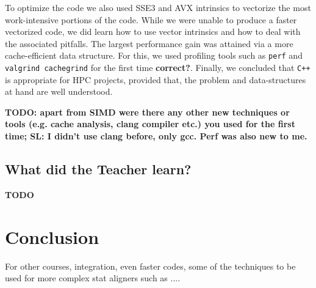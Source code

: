 \documentclass[runningheads,a4paper]{llncs}
\begin{document}
To optimize the code we also used SSE3 and AVX intrinsics to vectorize the most work-intensive portions of the code. 
While we were unable to produce a faster vectorized code, we did learn how to use vector intrinsics and how to deal with the associated pitfalls. 
The largest performance gain was attained via a more cache-efficient data structure. 
For this, we used profiling tools such as \texttt{perf} and \texttt{valgrind cachegrind} for the first time {\bf correct?}. 
Finally,  we concluded that \verb|C++| is appropriate for HPC projects, provided that, the problem and data-structures at hand are well understood.

{\bf TODO: apart from SIMD were there any other new techniques or tools (e.g. cache analysis, clang compiler etc.) you used for the first time; SL: I didn't use clang before, only gcc. Perf was also new to me.}

\subsection{What did the Teacher learn?}

{\bf TODO} 

\section{Conclusion}
\label{conclusion}
For other courses, integration, even faster codes, some of the techniques to be used for more complex stat aligners such as ....







\end{document}
